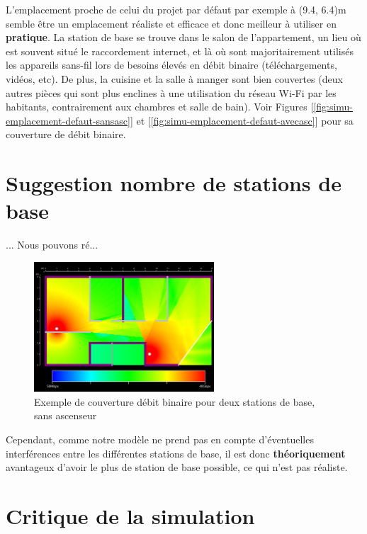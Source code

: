 L'emplacement proche de celui du projet par défaut par exemple à (9.4, 6.4)m semble être un emplacement réaliste et efficace et donc meilleur à utiliser en \textbf{pratique}. La station de base se trouve dans le salon de l'appartement, un lieu où est souvent situé le raccordement internet, et là où sont majoritairement utilisés les appareils sans-fil lors de besoins élevés en débit binaire (téléchargements, vidéos, etc). De plus, la cuisine et la salle à manger sont bien couvertes (deux autres pièces qui sont plus enclines à une utilisation du réseau Wi-Fi par les habitants, contrairement aux chambres et salle de bain). Voir Figures [\ref{fig:simu-emplacement-defaut-sansasc}] et [\ref{fig:simu-emplacement-defaut-avecasc}] pour sa couverture de débit binaire.\\


\section{Suggestion nombre de stations de base}
...
Nous pouvons ré...

\begin{figure}[H]
    \centering
    \includegraphics[width=0.6\textwidth]{latex/images/multiple-tx-highres-without-lift.png}
    \caption{Exemple de couverture débit binaire pour deux stations de base, sans ascenseur}
    \label{fig:simu-two-tx-without-lift}
\end{figure}

Cependant, comme notre modèle ne prend pas en compte d'éventuelles interférences entre les différentes stations de base, il est donc \textbf{théoriquement} avantageux d'avoir le plus de station de base possible, ce qui n'est pas réaliste.

\section{Critique de la simulation}

